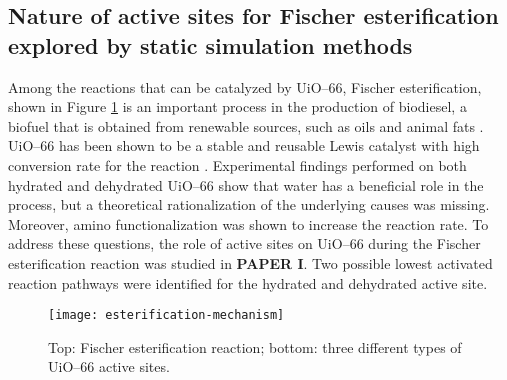 \subsection*{Nature of active sites for Fischer esterification explored by static simulation methods}
 Among the reactions that can be catalyzed by UiO--66, Fischer esterification, shown in Figure \ref{fig:esterification-mechanism} is an important process in the production of biodiesel, a biofuel that is obtained from renewable sources, such as oils and animal fats \cite{atadashi2011biodiesel, chouhan2011modern}. UiO--66 has been shown to be a stable and reusable Lewis catalyst with high conversion rate for the reaction \cite{cirujano2015conversion, cirujano2015zirconium}. Experimental findings performed on both hydrated and dehydrated UiO--66 show that water has a beneficial role in the process, but a theoretical rationalization of the underlying causes was missing. Moreover, amino functionalization was shown to increase the reaction rate. To address these questions, the role of active sites on UiO--66 during the Fischer esterification reaction was studied in \textbf{PAPER I}. Two possible lowest activated reaction pathways were identified for the hydrated and dehydrated active site.
\begin{figure}[!htbp]
	\centering
	\texttt{[image: esterification-mechanism]}
	\caption{Top: Fischer esterification reaction; bottom: three different types of UiO--66 active sites.}
	\label{fig:esterification-mechanism}
\end{figure}

